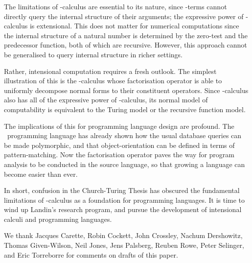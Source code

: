 \documentclass[a4paper]{article}
\begin{document}
The limitations of -calculus are essential to its nature, since
-terms cannot directly query the internal structure of their
arguments; the expressive power of -calculus is extensional. This
does not matter for numerical computations since the internal
structure of a natural number is determined by the zero-test and the
predecessor function, both of which are recursive.  However, this
approach cannot be generalised to query internal structure in richer
settings.

Rather, intensional computation requires a fresh outlook. The simplest
illustration of this is the -calculus whose factorisation operator
 is able to uniformly decompose normal forms to their constituent
operators.  Since -calculus also has all of the expressive power
of -calculus, its normal model of computability is equivalent to
the Turing model or the recursive function model.

The implications of this for programming language design are profound.
The \bondi\ programming language has already shown how the usual
database queries can be made polymorphic, and that object-orientation
can be defined in terms of pattern-matching.  Now the factorisation
operator paves the way for program analysis to be conducted in the
source language, so that growing a language can become easier than
ever.

In short, confusion in the Church-Turing Thesis has obscured the
fundamental limitations of -calculus as a foundation for
programming languages.  It is time to wind up Landin's research
program, and pursue the development of intensional calculi and
programming languages.


\medskip

 We thank Jacques Carette, Robin Cockett, John Crossley,
Nachum Dershowitz, Thomas Given-Wilson, Neil Jones, Jens Palsberg, Reuben Rowe,
Peter Selinger, and Eric Torreborre for comments on drafts of this paper.

 

\newpage 
\tableofcontents
\end{document}
